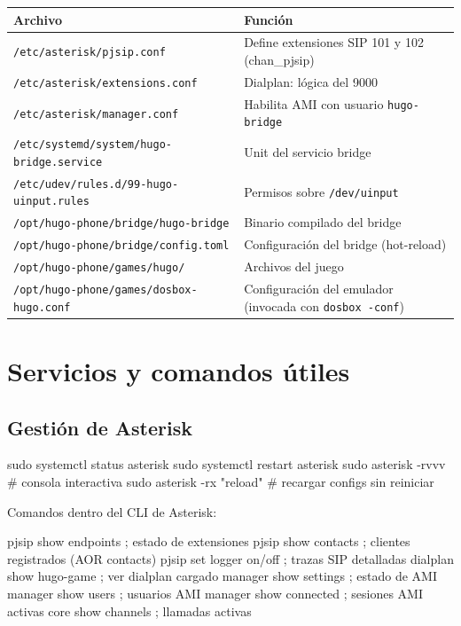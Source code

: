 \begin{table}[h]
\centering
\small
\begin{tabular}{p{} p{}}
\toprule
\textbf{Archivo} & \textbf{Función} \\
\midrule
\texttt{/etc/asterisk/pjsip.conf} & Define extensiones SIP 101 y 102 (chan\_pjsip) \\
\texttt{/etc/asterisk/extensions.conf} & Dialplan: lógica del 9000 \\
\texttt{/etc/asterisk/manager.conf} & Habilita AMI con usuario \texttt{hugo-bridge} \\
\texttt{/etc/systemd/system/hugo-bridge.service} & Unit del servicio bridge \\
\texttt{/etc/udev/rules.d/99-hugo-uinput.rules} & Permisos sobre \texttt{/dev/uinput} \\
\texttt{/opt/hugo-phone/bridge/hugo-bridge} & Binario compilado del bridge \\
\texttt{/opt/hugo-phone/bridge/config.toml} & Configuración del bridge (hot-reload) \\
\texttt{/opt/hugo-phone/games/hugo/} & Archivos del juego \\
\texttt{/opt/hugo-phone/games/dosbox-hugo.conf} & Configuración del emulador (invocada con \texttt{dosbox -conf}) \\
\bottomrule
\end{tabular}
\end{table}

\section{Servicios y comandos útiles}

\subsection{Gestión de Asterisk}

\begin{shellcode}
sudo systemctl status asterisk
sudo systemctl restart asterisk
sudo asterisk -rvvv               # consola interactiva
sudo asterisk -rx "reload"        # recargar configs sin reiniciar
\end{shellcode}

Comandos dentro del CLI de Asterisk:

\begin{plaincode}
pjsip show endpoints        ; estado de extensiones
pjsip show contacts         ; clientes registrados (AOR contacts)
pjsip set logger on/off     ; trazas SIP detalladas
dialplan show hugo-game     ; ver dialplan cargado
manager show settings       ; estado de AMI
manager show users          ; usuarios AMI
manager show connected      ; sesiones AMI activas
core show channels          ; llamadas activas
\end{plaincode}

